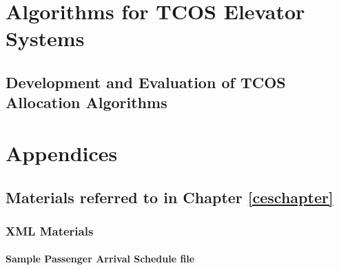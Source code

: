 \documentclass{UoYCSproject}
\begin{document}
\part{Algorithms for TCOS Elevator Systems}

\chapter{Development and Evaluation of TCOS Allocation Algorithms}



\appendix
\part{Appendices}

\chapter{Materials referred to in Chapter \ref{ceschapter}}

\section{XML Materials}

\subsection{Sample Passenger Arrival Schedule file}
\end{document}
